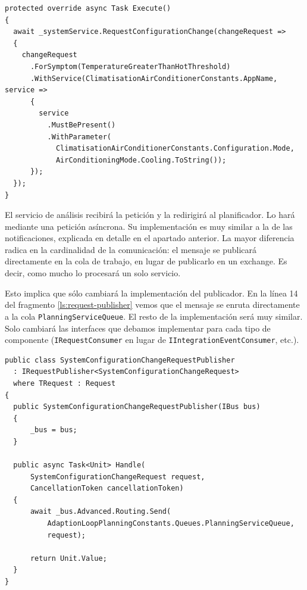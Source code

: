 \begin{lstlisting}[language={[Sharp]C},caption={Implementación de la misma petición siguiendo el patrón \emph{builder}.},captionpos=b, label=ls:change-request-builder]
protected override async Task Execute()
{
  await _systemService.RequestConfigurationChange(changeRequest =>
  {
    changeRequest
      .ForSymptom(TemperatureGreaterThanHotThreshold)
      .WithService(ClimatisationAirConditionerConstants.AppName, service =>
      {
        service
          .MustBePresent()
          .WithParameter(
            ClimatisationAirConditionerConstants.Configuration.Mode,
            AirConditioningMode.Cooling.ToString());
      });
  });
}
\end{lstlisting}

El servicio de análisis recibirá la petición y la redirigirá al planificador. Lo hará mediante una petición asíncrona. Su implementación es muy similar a la de las notificaciones, explicada en detalle en el apartado anterior. La mayor diferencia radica en la cardinalidad de la comunicación: el mensaje se publicará directamente en la cola de trabajo, en lugar de publicarlo en un exchange. Es decir, como mucho lo procesará un solo servicio.

Esto implica que sólo cambiará la implementación del publicador. En la línea 14 del fragmento \ref{ls:request-publisher} vemos que el mensaje se enruta directamente a la cola \texttt{PlanningServiceQueue}. El resto de la implementación será muy similar. Solo cambiará las interfaces que debamos implementar para cada tipo de componente (\texttt{IRequestConsumer} en lugar de \texttt{IIntegrationEventConsumer}, etc.).

\begin{lstlisting}[language={[Sharp]C},caption={Las peticiones asíncronas se publican a una cola determinada.},captionpos=b, label=ls:request-publisher]
public class SystemConfigurationChangeRequestPublisher
  : IRequestPublisher<SystemConfigurationChangeRequest>
  where TRequest : Request
{
  public SystemConfigurationChangeRequestPublisher(IBus bus)
  {
      _bus = bus;
  }

  public async Task<Unit> Handle(
      SystemConfigurationChangeRequest request,
      CancellationToken cancellationToken)
  {
      await _bus.Advanced.Routing.Send(
          AdaptionLoopPlanningConstants.Queues.PlanningServiceQueue,
          request);

      return Unit.Value;
  }
}
\end{lstlisting}

